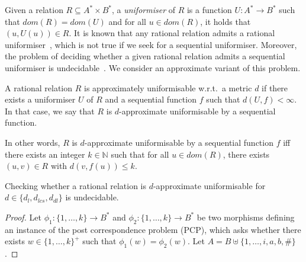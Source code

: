 \documentclass[a4paper,UKenglish,cleveref, autoref, thm-restate,authorcolumns, colorlinks]{lipics-v2021}
\newcommand\dom{\mathit{dom}}
\begin{document}
{Given a relation $R\subseteq A^*\times B^*$, a \emph{uniformiser} of $R$ is a function $U : A^*\rightarrow B^*$ such that $\dom(R) = \dom(U)$ and 
for all $u\in\dom(R)$, it holds that $(u,U(u))\in R$. It is known that any rational relation admits a rational uniformiser~\cite{KOBAYASHI1969}, which is not true if we seek for a sequential uniformiser. Moreover, the problem of deciding whether a given rational relation admits a sequential uniformiser is undecidable~\cite{LoC}. We consider an approximate variant of this problem.

\begin{definition}\label{def:approxuni}
   A rational relation $R$ is approximately uniformisable w.r.t.~a metric $d$ if there exists a 
    uniformiser $U$ of $R$ and a sequential function $f$ such that $d(U,f)<\infty$. In that case, we say that $R$ is $d$-approximate uniformisable by a sequential function. 
\end{definition}
In other words, $R$ is $d$-approximate uniformisable by a sequential function $f$ iff there exists an integer $k \in \mathbb{N}$ such that for all $u\in dom(R)$, there exists $(u,v)\in R$ with $d(v,f(u))\leq k$. 

\begin{theorem}\label{thm:app-un}
Checking whether a rational relation is $d$-approximate uniformisable for $d \in \{d_l,d_{lcs},d_{dl}\}$ is undecidable.
\end{theorem}

\begin{proof}
Let $\phi_1 : \{1,\dots,k\}\rightarrow B^*$ and $\phi_2 :\{1,\dots,k\}\rightarrow B^*$ be two morphisms defining an instance of the post correspondence problem (PCP), which asks whether there exists $w\in\{1,\dots,k\}^+$ such that $\phi_1(w) = \phi_2(w)$. Let $A = B\uplus \{1,\dots,i,a,b,\#\}$.



\end{proof}}
\end{document}
